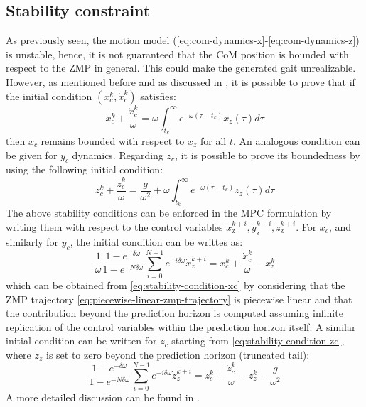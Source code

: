 \subsection{Stability constraint}
\label{sec:mpc-stability-constraint}
As previously seen, the motion model
(\ref{eq:com-dynamics-x}-\ref{eq:com-dynamics-z}) is unstable, hence, it is 
not guaranteed that the CoM position is bounded with respect to the ZMP in 
general. This could make the generated gait unrealizable. However, as mentioned 
before and as discussed in \cite{Lanari2014BoundednessII,
DBLP:conf/humanoids/SciancaCSLO16}, it is possible to prove that if the 
initial condition $(x_c^k, \dot{x}_c^k)$ satisfies:
\begin{equation}
  \label{eq:stability-condition-xc}
  x_c^k + \frac{\dot{x}_c^k}{\omega} = \omega \int_{t_k}^\infty 
      e^{-\omega(\tau-t_k)}x_z(\tau)d\tau
\end{equation}
then $x_c$ remains bounded with respect to $x_z$ for
all $t$. An analogous condition can be given for $y_c$ dynamics.
Regarding $z_c$, it is possible to prove its boundedness by using the following
initial condition:
\begin{equation}
  \label{eq:stability-condition-zc}
  z_c^k + \frac{\dot{z}_c^k}{\omega} = \frac{g}{\omega^2} +
      \omega \int_{t_k}^\infty e^{-\omega(\tau-t_k)}z_z(\tau)d\tau
\end{equation}
The above stability conditions can be enforced in the MPC formulation by 
writing them with respect to the control variables $\dot{x}_\text{z}^{k+i},
\dot{y}_\text{z}^{k+i}, \dot{z}_\text{z}^{k+i}$. For $x_c$,
and similarly for $y_c$, the initial condition can be 
writtes as:
\begin{equation}
  \label{eq:stability-constraint-xdot}
  \frac{1}{\omega}\frac{1-e^{-\delta\omega}}{1-e^{-N\delta\omega}}
    \sum_{i=0}^{N-1} e^{-i\delta\omega} \dot{x}_z^{k+i} =
    x_c^k + \frac{\dot{x}_c^k}{\omega} - x_z^k
\end{equation}
which can be obtained from \eqref{eq:stability-condition-xc} by considering 
that the ZMP trajectory \eqref{eq:piecewise-linear-zmp-trajectory} is piecewise 
linear and that the contribution beyond the prediction horizon is computed 
assuming infinite replication of the control variables within the prediction 
horizon itself. A similar initial condition can be written for $z_c$
starting from \eqref{eq:stability-condition-zc}, where $\dot{z}_z$ is set to zero 
beyond the prediction horizon (truncated tail):
\begin{equation}
  \label{eq:stability-constraint-zdot}
  \frac{1-e^{-\delta\omega}}{1-e^{-N\delta\omega}}
    \sum_{i=0}^{N-1} e^{-i\delta\omega} \dot{z}_z^{k+i} =
    z_c^k + \frac{\dot{z}_c^k}{\omega} - z_z^k - \frac{g}{\omega^2}
\end{equation}
A more detailed discussion can be found in
\cite{DBLP:journals/corr/abs-1901-08505}.

